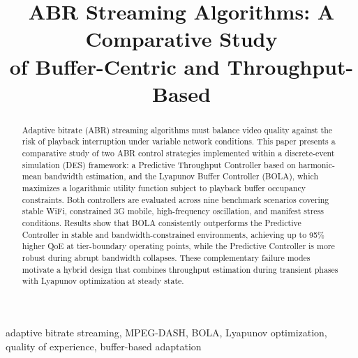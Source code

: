 \documentclass[conference]{IEEEtran}
\begin{document}
\title{ABR Streaming Algorithms: A Comparative Study\\ of Buffer-Centric and Throughput-Based}

\author{%
}

\maketitle

\begin{abstract}
Adaptive bitrate (ABR) streaming algorithms must balance video quality
against the risk of playback interruption under variable network conditions.
This paper presents a comparative study of two ABR control strategies
implemented within a discrete-event simulation (DES) framework: a Predictive
Throughput Controller based on harmonic-mean bandwidth estimation, and the
Lyapunov Buffer Controller (BOLA), which maximizes a logarithmic utility
function subject to playback buffer occupancy constraints.  Both controllers
are evaluated across nine benchmark scenarios covering stable WiFi,
constrained 3G mobile, high-frequency oscillation, and manifest stress
conditions.  Results show that BOLA consistently outperforms the Predictive
Controller in stable and bandwidth-constrained environments, achieving up
to 95\% higher QoE at tier-boundary operating points, while the Predictive
Controller is more robust during abrupt bandwidth collapses.  These
complementary failure modes motivate a hybrid design that combines
throughput estimation during transient phases with Lyapunov optimization
at steady state.
\end{abstract}

\begin{IEEEkeywords}
adaptive bitrate streaming, MPEG-DASH, BOLA, Lyapunov optimization,
quality of experience, buffer-based adaptation
\end{IEEEkeywords}

\end{document}
